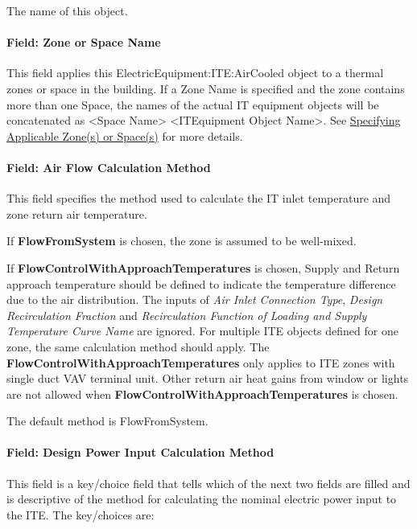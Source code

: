 The name of this object.

\paragraph{Field: Zone or Space Name}\label{iteq-field-zone-or-space-name-000}

This field applies this ElectricEquipment:ITE:AirCooled object to a thermal zones or space in the building. If a Zone Name is specified and the zone contains more than one Space, the names of the actual IT equipment objects will be concatenated as \textless{}Space Name\textgreater{} \textless{}ITEquipment Object Name\textgreater{}. See \hyperref[specifying-applicable-zones-or-spaces]{Specifying Applicable Zone(s) or Space(s)} for more details.

\paragraph{Field: Air Flow Calculation Method}\label{field-air-flow-calculation-method}

This field specifies the method used to calculate the IT inlet temperature and zone return air temperature.

If \textbf{FlowFromSystem} is chosen, the zone is assumed to be well-mixed.

If \textbf{FlowControlWithApproachTemperatures} is chosen, Supply and Return approach temperature should be defined to indicate the temperature difference due to the air distribution. The inputs of \textit{Air Inlet Connection Type}, \textit{Design Recirculation Fraction} and \textit{Recirculation Function of Loading and Supply Temperature Curve Name} are ignored. For multiple ITE objects defined for one zone, the same calculation method should apply. The \textbf{FlowControlWithApproachTemperatures} only applies to ITE zones with single duct VAV terminal unit. Other return air heat gains from window or lights are not allowed when \textbf{FlowControlWithApproachTemperatures} is chosen.

The default method is FlowFromSystem.

\paragraph{Field: Design Power Input Calculation Method}\label{field-design-power-input-calculation-method}

This field is a key/choice field that tells which of the next two fields are filled and is descriptive of the method for calculating the nominal electric power input to the ITE. The key/choices are:

